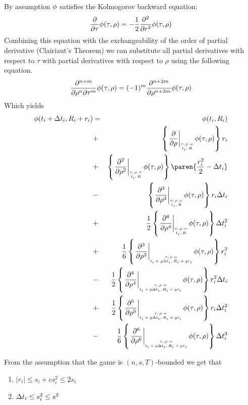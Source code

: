 \documentclass{article}[12pt]
\begin{document}
{{By assumption $\phi$ satisfies the Kolmogorov backward equation:
\begin{equation*} 
  \frac{\partial}{\partial \tau} \phi(\tau,\rho)
  = -\frac{1}{2} \frac{\partial^2}{\partial r^2} \phi(\tau,\rho)
\end{equation*}
Combining this equation with the exchangeability of the order of
partial derivative (Clairiaut's Theorem) we can substitute all
partial derivatives with respect to $\tau$ with partial derivatives
with respect to $\rho$ using the following equation.
\[
  \frac{\partial^{n+m}}{\partial \rho^n \partial \tau^m} \phi(\tau,\rho)=
  (-1)^m \frac{\partial^{n+2m}}{\partial \rho^{n+2m}} \phi(\tau,\rho)
\]
Which yields
\begin{eqnarray}
      \pot(t_i+\deltat_i,\R_i+r_i) & =&  
    \pot(t_i,\R_i)\\
    &+& \at{\frac{\partial}{\partial \rho}} r_i \label{term:coll1}\\
    &+& \at{\frac{\partial^2}{\partial \rho^2}} \paren{\frac{r_i^2}{2}-\deltat_i} \label{term:coll2}\\
    &-& \at{\frac{\partial^3}{\partial \rho^3}} r_i \deltat_i \label{term:coll3}\\
    &+& \frac{1}{2} \at{\frac{\partial^4}{\partial \rho^4}} \deltat_i^2 \label{term:coll4}\\
    &+& \frac{1}{6} \att{\frac{\partial^3}{\partial \rho^3}} r_i^3 \label{term:coll5}\\
    &-& \frac{1}{2} \att{\frac{\partial^4}{\partial \rho^4}} r_i^2\deltat_i \label{term:coll6}\\
    &+& \frac{1}{2} \att{\frac{\partial^5}{\partial \rho^5}} r_i\deltat_i^2 \label{term:coll7}\\
    &-& \frac{1}{6} \att{\frac{\partial^6}{\partial \rho^6}} \deltat_i^3 \label{term:coll8}
\end{eqnarray}

  From the assumption that the game is $(n,s,T)$-bounded we get that 
  \begin{enumerate}
  \item $|r_i| \leq s_i +c s_i^2 \leq 2 s_i$
  \item $\Delta t_i \leq s_i^2 \leq s^2$
  \end{enumerate}

}}
\end{document}
